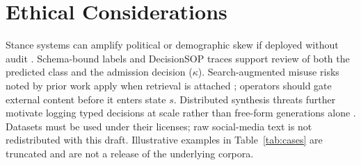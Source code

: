 \documentclass[10pt]{article}
\theoremstyle{definition}
\begin{document}
\section*{Ethical Considerations}
Stance systems can amplify political or demographic skew if deployed without audit \cite{li2024factual}.
Schema-bound labels and DecisionSOP traces support review of both the predicted class and the admission
decision ($\kappa$).
Search-augmented misuse risks noted by prior work apply when retrieval is attached
\cite{yan2026searchattack}; operators should gate external content before it enters state $s$.
Distributed synthesis threats further motivate logging typed decisions at scale rather than free-form
generations alone \cite{yan2025poisonswarm}.
Datasets must be used under their licenses; raw social-media text is not redistributed with this draft.
Illustrative examples in Table~\ref{tab:cases} are truncated and are not a release of the underlying corpora.

\begingroup
\small


\endgroup
\end{document}
